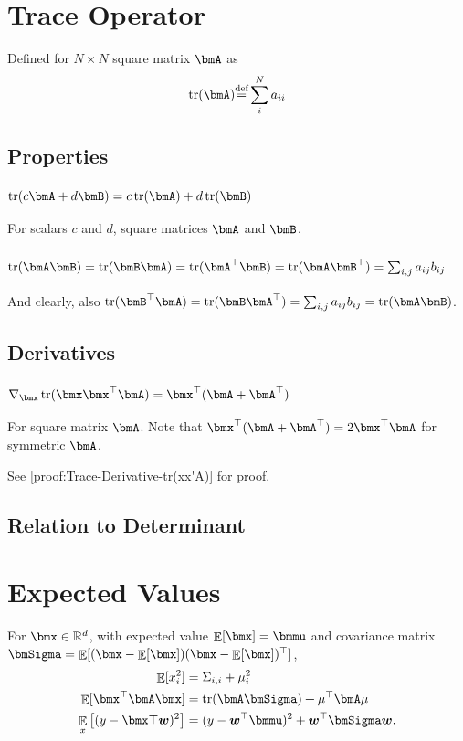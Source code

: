 \documentclass[11pt]{article}
\def\R{{\mathbb{R}}}
\DeclareMathOperator{\E}{\mathbb{E}}
\def\Def{{\stackrel{\text{def}}{=}}}
\DeclareMathOperator{\Trace}{tr}
\begin{document}
\section{Trace Operator}
Defined for $N \times N$ square matrix $\bmA$ as
\begin{equation}
\Trace(\bmA) \Def \sum_{i}^{N} a_{ii}
\label{eq:Definition-Trace}
\end{equation}

\subsection{Properties}

\subsubsection{$\Trace(c\bmA + d\bmB) = c\Trace(\bmA) + d\Trace(\bmB)$}
For scalars $c$ and $d$, square matrices $\bmA$ and $\bmB$.

\subsubsection{$\Trace(\bmA\bmB) = \Trace(\bmB\bmA) = \Trace(\bmA^\top\bmB) = \Trace(\bmA\bmB^\top) = \sum_{i,j} a_{ij}b_{ij}$}
And clearly, also $\Trace(\bmB^\top\bmA) = \Trace(\bmB\bmA^\top) = \sum_{i,j} a_{ij}b_{ij} = \Trace(\bmA\bmB)$.

\subsection{Derivatives}

\subsubsection{$\nabla_{\bmx}\Trace(\bmx \bmx^\top \bmA) = \bmx^\top (\bmA + \bmA^\top)$}
\label{sec:Trace-Derivative-tr(xx'A)}
For square matrix $\bmA$.
Note that $\bmx^\top (\bmA + \bmA^\top) = 2\bmx^\top \bmA$ for symmetric $\bmA$.

See \cref{proof:Trace-Derivative-tr(xx'A)} for proof.

\subsection{Relation to Determinant}


\section{Expected Values}
For $\bmx \in \R^d$, with expected value $\E[\bmx] = \bmmu$ and covariance matrix $ \bmSigma = \E[(\bmx - \E[\bmx]) (\bmx - \E[\bmx])^\top]$,
\begin{align}
\E[x_i^2] &= \Sigma_{i,i} + \mu_i^2
\\
\E[\bmx^\top \bmA \bmx] &= \Trace(\bmA \bmSigma) + \mu^\top \bmA \mu
\\
\E_{x} \left[ (y - \bmx\top \bm{w})^2 \right]
&= (y - \bm{w}^\top \bmmu)^2 + \bm{w}^\top \bmSigma \bm{w}.
\end{align}
\end{document}
